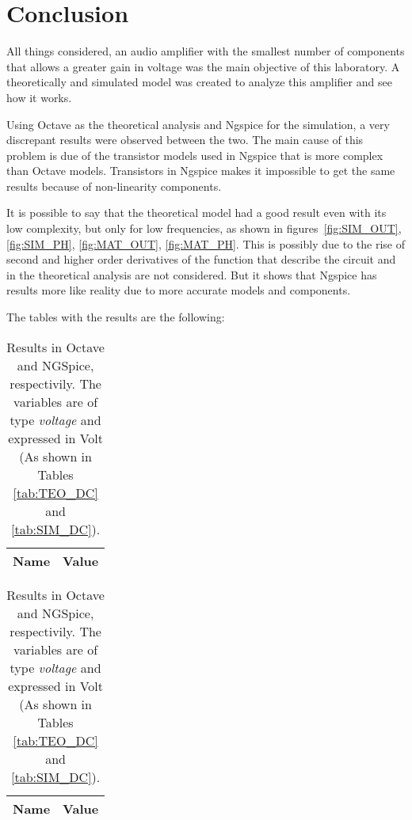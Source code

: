 \section{Conclusion}
\label{sec:conclusion}

All things considered, an audio amplifier with the smallest number of components that allows a greater gain in voltage was the main objective of this laboratory. A theoretically and simulated model was created to analyze this amplifier and see how it works. \par
Using Octave as the theoretical analysis and Ngspice for the simulation, a very discrepant results were observed between the two. The main cause of this problem is due of the transistor models used in Ngspice that is more complex than Octave models. Transistors in Ngspice makes it impossible to get the same results because of non-linearity components.\par
It is possible to say that the theoretical model had a good result even with its low complexity, but only for low frequencies, as shown in figures~\ref{fig:SIM_OUT}, \ref{fig:SIM_PH}, \ref{fig:MAT_OUT}, \ref{fig:MAT_PH}. This is possibly due to the rise of second and higher order derivatives of the function that describe the circuit and in the theoretical analysis are not considered. But it shows that Ngspice has results more like reality due to more accurate models and components.

The tables with the results are the following:


\begin{table}[h]
\centering
\begin{minipage}[t]{0.35\linewidth}
 	 \begin{tabular}[t]{|l|r|}
 	   \hline    
 	   {\bf Name} & {\bf Value} \\ \hline
 	   
 	 \end{tabular}
\end{minipage}
\begin{minipage}[t]{0.40\linewidth}
  	\begin{tabular}[t]{|l|r|}
    	\hline    
   		{\bf Name} & {\bf Value} \\ \hline
    	
  	\end{tabular}
\end{minipage}

  	\caption{Results in Octave and NGSpice, respectivily. The variables are of type {\it voltage} and expressed in Volt (As shown in Tables \ref{tab:TEO_DC} and \ref{tab:SIM_DC}).}
\end{table}

